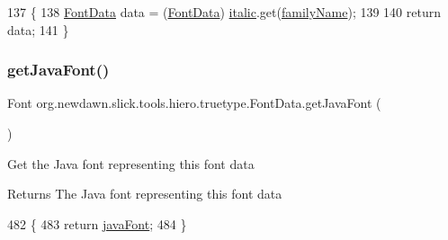 \begin{DoxyCode}
137                                                         \{
138         \mbox{\hyperlink{classorg_1_1newdawn_1_1slick_1_1tools_1_1hiero_1_1truetype_1_1_font_data_a749bc5408e8c04106d580a31b5c9e597}{FontData}} data = (\mbox{\hyperlink{classorg_1_1newdawn_1_1slick_1_1tools_1_1hiero_1_1truetype_1_1_font_data_a749bc5408e8c04106d580a31b5c9e597}{FontData}}) \mbox{\hyperlink{classorg_1_1newdawn_1_1slick_1_1tools_1_1hiero_1_1truetype_1_1_font_data_a2ef9fd6b5308c94238907b9a0a796842}{italic}}.get(\mbox{\hyperlink{classorg_1_1newdawn_1_1slick_1_1tools_1_1hiero_1_1truetype_1_1_font_data_a287c606f09e3581f4eaea1b7bd81ded1}{familyName}});
139         
140         \textcolor{keywordflow}{return} data;
141     \}
\end{DoxyCode}
\mbox{\label{classorg_1_1newdawn_1_1slick_1_1tools_1_1hiero_1_1truetype_1_1_font_data_a3b982990cc4c4f1d489e2ffe3e2fc431}} 
\subsubsection{\texorpdfstring{get\+Java\+Font()}{getJavaFont()}}
{\footnotesize\ttfamily Font org.\+newdawn.\+slick.\+tools.\+hiero.\+truetype.\+Font\+Data.\+get\+Java\+Font (\begin{DoxyParamCaption}{ }\end{DoxyParamCaption})\hspace{0.3cm}{\ttfamily [inline]}}

Get the Java font representing this font data

\begin{DoxyReturn}{Returns}
The Java font representing this font data 
\end{DoxyReturn}

\begin{DoxyCode}
482                               \{
483         \textcolor{keywordflow}{return} \mbox{\hyperlink{classorg_1_1newdawn_1_1slick_1_1tools_1_1hiero_1_1truetype_1_1_font_data_ab48e0ef57ae93083499407b9998d93a6}{javaFont}};
484     \}
\end{DoxyCode}
\mbox{\label{classorg_1_1newdawn_1_1slick_1_1tools_1_1hiero_1_1truetype_1_1_font_data_a21314f898e3393444e54c0aeefb9ed2a}} 
